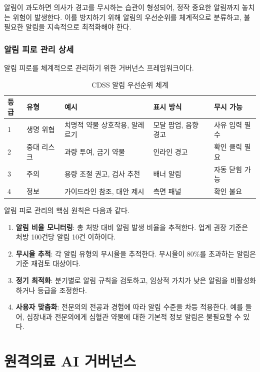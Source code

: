 알림이 과도하면 의사가 경고를 무시하는 습관이 형성되어, 정작 중요한 알림까지 놓치는 위험이 발생한다. 이를 방지하기 위해 알림의 우선순위를 체계적으로 분류하고, 불필요한 알림을 지속적으로 최적화해야 한다.

\subsubsection{알림 피로 관리 상세}

알림 피로를 체계적으로 관리하기 위한 거버넌스 프레임워크이다.

\begin{table}[htbp]
\centering
\caption{CDSS 알림 우선순위 체계}
\label{tab:16_alert_priority}
\begin{tabularx}{\textwidth}{p{1.5cm}p{2cm}Xp{3cm}p{2cm}}
\toprule
\textbf{등급} & \textbf{유형} & \textbf{예시} & \textbf{표시 방식} & \textbf{무시 가능} \\
\midrule
1 & 생명 위협 & 치명적 약물 상호작용, 알레르기 & 모달 팝업, 음향 경고 & 사유 입력 필수 \\
2 & 중대 리스크 & 과량 투여, 금기 약물 & 인라인 경고 & 확인 클릭 필요 \\
3 & 주의 & 용량 조절 권고, 검사 추천 & 배너 알림 & 자동 닫힘 가능 \\
4 & 정보 & 가이드라인 참조, 대안 제시 & 측면 패널 & 확인 불요 \\
\bottomrule
\end{tabularx}
\end{table}

알림 피로 관리의 핵심 원칙은 다음과 같다.

\begin{enumerate}
 \item \textbf{알림 비율 모니터링}: 총 처방 대비 알림 발생 비율을 추적한다. 업계 권장 기준은 처방 100건당 알림 10건 이하이다.
 \item \textbf{무시율 추적}: 각 알림 유형의 무시율을 추적한다. 무시율이 80\%를 초과하는 알림은 기준 재검토 대상이다.
 \item \textbf{정기 최적화}: 분기별로 알림 규칙을 검토하고, 임상적 가치가 낮은 알림을 비활성화하거나 등급을 조정한다.
 \item \textbf{사용자 맞춤화}: 전문의의 전공과 경험에 따라 알림 수준을 차등 적용한다. 예를 들어, 심장내과 전문의에게 심혈관 약물에 대한 기본적 정보 알림은 불필요할 수 있다.
\end{enumerate}

\section{원격의료 AI 거버넌스}
\label{sec:16.4.3}

